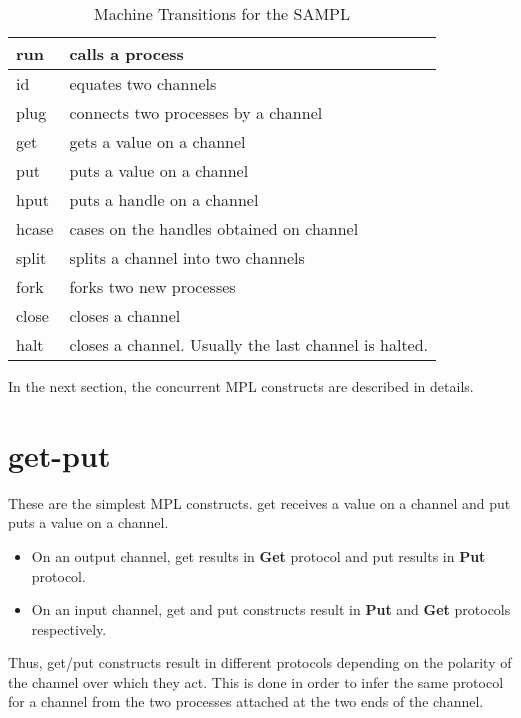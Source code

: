 \documentclass[11pt]{article}
\newcommand{\<}{\langle}
\renewcommand{\>}{\rangle}
\begin{document}
\begin{table}[!h]
\begin{center}
    \begin{tabular}{|l||l|}
    \hline 
        {\sf run} & calls a process \\ \hline 
        {\sf id}  & equates two channels \\ \hline 
        {\sf plug} & connects two processes by a channel \\ \hline  
        {\sf get} & gets a value on a channel \\ \hline 
        {\sf put} & puts a value on a channel \\ \hline 
        {\sf hput} & puts a handle on a channel \\ \hline 
        {\sf hcase} & cases on the handles obtained on channel \\ \hline 
        {\sf split} & splits a channel into two channels \\ \hline 
        {\sf fork} & forks two new processes \\ \hline 
        {\sf close} & closes a channel \\ \hline 
        {\sf halt} & closes a channel. Usually the last channel is halted. \\ \hline
   \end{tabular}
\caption{Machine Transitions for the SAMPL}
\label{AMPL:TranSeqTable}
\end{center}
\end{table}

In the next section, the concurrent MPL constructs are described in details.

\section{get-put}
These are the simplest MPL constructs. {\sf get} receives a value on a channel and {\sf put} puts a value on a channel. 
\begin{itemize}
  \item On an output channel, {\sf get} results in {\bf Get} protocol and {\sf put} results in {\bf Put} protocol.
  \item On an input channel, {\sf get} and {\sf put} constructs result in {\bf Put} and {\bf Get} protocols respectively.
\end{itemize}
Thus, {\sf get/put} constructs result in different protocols depending on the polarity of the channel over which they act. This is done in order to infer the same protocol for a channel from the two processes attached at the two ends of the channel.
\end{document}
